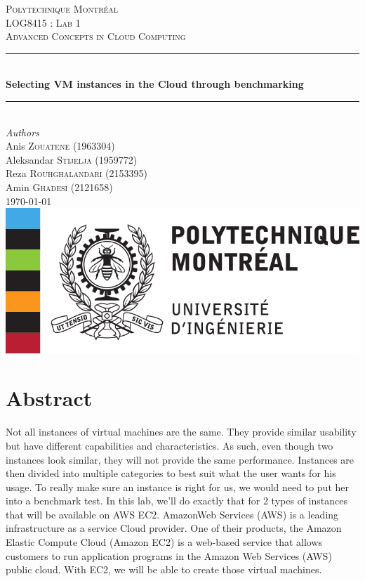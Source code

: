 \documentclass[12pt]{article}
\begin{document}
\begin{titlepage} 
	\newcommand{\HRule}{\rule{\linewidth}{0.5mm}}
	\center
	\textsc{\LARGE Polytechnique Montréal}\\[1.5cm]
	\textsc{\Large LOG8415 : Lab 1}\\[0.5cm]
	\textsc{\large Advanced Concepts in Cloud Computing}\\[0.5cm]
	\HRule\\[0.4cm]
	{\huge\bfseries Selecting VM instances in the Cloud through
	benchmarking}\\[0.4cm]
	\HRule\\[1.5cm]
	{\large\textit{Authors}}\\
	Anis \textsc{Zouatene} (1963304)\\
	Aleksandar \textsc{Stijelja} (1959772)\\
	Reza \textsc{Rouhghalandari} (2153395)\\
    Amin \textsc{Ghadesi} (2121658)\\
	\vfill\vfill\vfill {\large\today} \vfill\vfill
	\includegraphics{images/poly-logo.png}\\[1cm]
	\vfill
\end{titlepage}


\section{Abstract}
	\paragraph{} Not all instances of virtual machines are the same. 
    They provide similar usability but have different capabilities 
    and characteristics. As such, even though two instances look similar, 
    they will not provide the same performance. Instances are then divided 
    into multiple categories to best suit what the user wants for his usage. 
    To really make sure an instance is right for us, we would need to put her 
    into a benchmark test. In this lab, we’ll do exactly that for 2 types of 
    instances that will be available on AWS EC2. AmazonWeb Services (AWS) is 
    a leading infrastructure as a service Cloud provider. One of their products, 
    the Amazon Elastic Compute Cloud (Amazon EC2) is a web-based service that 
    allows customers to run application programs in the Amazon Web Services (AWS) 
    public cloud. With EC2, we will be able to create those virtual machines.
\end{document}
